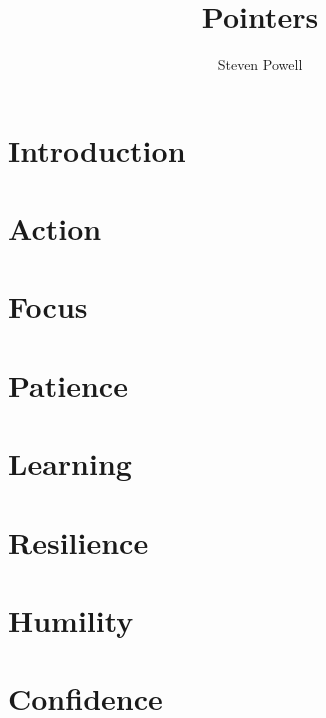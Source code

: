 \documentclass[a5paper]{book}
\title{Pointers}
\author{Steven Powell}
\begin{document}
\maketitle{}
\tableofcontents

\chapter{Introduction}


\chapter{Action}


\chapter{Focus}


\chapter{Patience}


\chapter{Learning}


\chapter{Resilience}


\chapter{Humility}


\chapter{Confidence}


\end{document}
